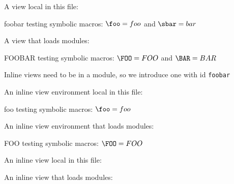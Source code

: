 \documentclass[minimal]{omdoc}
\begin{document}
\begin{module}[id=foo]
\end{module}

\begin{module}[id=bar]
\end{module}

A view local in this file:
\begin{view}{foo}{bar}
  testing symbolic macros: $\foo = foo$ and $\sbar=bar$
\end{view}

A view that loads modules:
\begin{view}[loadfrom=FOO,loadto=BAR]{FOO}{BAR}
  testing symbolic macros: $\FOO = FOO$ and $\BAR=BAR$
\end{view}

Inline views need to be in a module, so we introduce one with id \texttt{foobar}

\begin{module}[id=foobar] 
 An inline view environment local in this file:
\begin{inlineView}{foo}
  testing symbolic macros: $\foo = foo$
\end{inlineView}

An inline view environment that loads modules:
\begin{inlineView}[loadfrom=FOO]{FOO}
  testing symbolic macros: $\FOO = FOO$
\end{inlineView}

An inline view local in this file:

An inline view that loads modules: 
\end{module}
\end{document}
